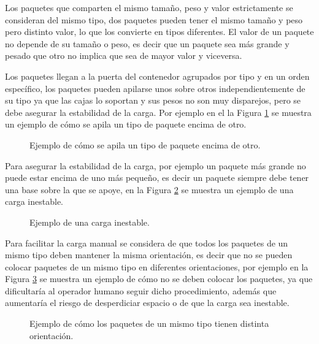Los paquetes que comparten el mismo tamaño, peso y valor estrictamente se consideran del mismo tipo, dos paquetes pueden tener el mismo tamaño y peso pero distinto valor, lo que los convierte en tipos diferentes. El valor de un paquete no depende de su tamaño o peso, es decir que un paquete sea más grande y pesado que otro no implica que sea de mayor valor y viceversa.

Los paquetes llegan a la puerta del contenedor agrupados por tipo y en un orden específico, los paquetes pueden apilarse unos sobre otros independientemente de su tipo ya que las cajas lo soportan y sus pesos no son muy disparejos, pero se debe asegurar la estabilidad de la carga. Por ejemplo en el la Figura \ref{fig:paquetes_apilados} se muestra un ejemplo de cómo se apila un tipo de paquete encima de otro.

\begin{figure}[H]
    \centering
    
    \caption{Ejemplo de cómo se apila un tipo de paquete encima de otro.}
    \label{fig:paquetes_apilados}
\end{figure}

Para asegurar la estabilidad de la carga, por ejemplo un paquete más grande no puede estar encima de uno más pequeño, es decir un paquete siempre debe tener una base sobre la que se apoye, en la Figura \ref{fig:paquetes_mal_apilados} se muestra un ejemplo de una carga inestable.

\begin{figure}[H]
    \centering
    
    \caption{Ejemplo de una carga inestable.}
    \label{fig:paquetes_mal_apilados}
\end{figure}

Para facilitar la carga manual se considera de que todos los paquetes de un mismo tipo deben mantener la misma orientación, es decir que no se pueden colocar paquetes de un mismo tipo en diferentes orientaciones, por ejemplo en la Figura \ref{fig:paquetes_mal_orientados} se muestra un ejemplo de cómo no se deben colocar los paquetes, ya que dificultaría al operador humano seguir dicho procedimiento, además que aumentaría el riesgo de desperdiciar espacio o de que la carga sea inestable.

\begin{figure}[H]
    \centering
    
    \caption{Ejemplo de cómo los paquetes de un mismo tipo tienen distinta orientación.}
    \label{fig:paquetes_mal_orientados}
\end{figure}

